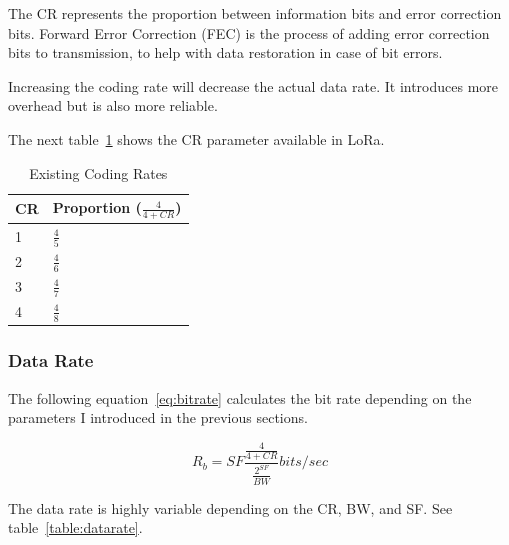 The CR represents the proportion between information bits and error
correction bits. 
Forward Error Correction (FEC) is the process of adding error correction bits to
transmission, to help with data restoration in case of bit errors.

Increasing the coding rate will decrease the actual data rate. 
It introduces more overhead but is also more reliable.

The next table~\ref{table:cr} shows the CR parameter available in LoRa.

\begin{table}[h!]
\centering
\begin{tabular}{@{}ll@{}}
\hline
CR & Proportion ($\frac{4}{4 + CR}$) \\ \midrule
1                                                & $\frac{4}{5}$\\
2                                                & $\frac{4}{6}$\\
3                                                & $\frac{4}{7}$\\
4                                                & $\frac{4}{8}$\\ \bottomrule
\end{tabular}
\caption{Existing Coding Rates\label{table:cr}}
\end{table}

\subsubsection{Data Rate}

The following equation~\ref{eq:bitrate} calculates the bit rate depending on the
parameters I introduced in the previous sections\cite{semtech:modulationbasics}.

\begin{equation}
 \label{eq:bitrate} 
  R_{b} = SF \frac{\frac{4}{4 + CR}}{\frac{2^{SF}}{BW}} bits/sec
\end{equation}

The data rate is highly variable depending on the CR, BW, and SF.
See table~\ref{table:datarate}.

